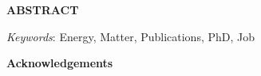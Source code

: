 \documentclass[12pt, twoside,openright]{report}
\begin{document}
\begin{spacing}{1.5}
\begin{titlepage}
\begin{enumerate}
\end{enumerate}


\end{titlepage}




\newpage
\thispagestyle{empty}
\mbox{}
\newpage
\begin{titlepage}
\pagestyle{empty}
\begin{center}
\large \textbf{ABSTRACT}
\end{center}


\hspace*{0cm}
\lipsum[1]
\lipsum[2]

\vspace*{12pt}
\noindent \textit {Keywords}: {Energy, Matter, Publications, PhD, Job}




\end{titlepage}




\newpage
\thispagestyle{empty}
\mbox{}
\newpage
\begin{titlepage}
\pagestyle{empty}
\begin{center}
\large \textbf{Acknowledgements}
\end{center}



\hspace*{0cm}

\lipsum[1]
\lipsum[2]


\end{titlepage}



\end{spacing}
\end{document}

